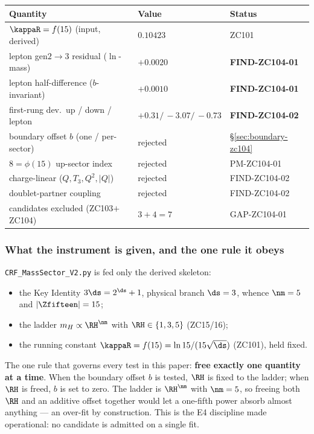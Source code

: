 \documentclass[12pt, a4paper]{article}
\begin{document}
\begin{keybox}[title={Numerical Summary --- ZC104 (T-canonical)}]
{\small\renewcommand{\arraystretch}{1.25}
\begin{center}
\begin{tabular}{@{}p{6.2cm}p{3.2cm}p{3.0cm}@{}}
\toprule
\textbf{Quantity} & \textbf{Value} & \textbf{Status} \\
\midrule
$\kappaR=f(15)$ (input, derived)          & $0.10423$        & ZC101 \\
lepton gen$2{\to}3$ residual ($\ln$-mass) & $+0.0020$        & \textbf{FIND-ZC104-01} \\
lepton half-difference ($b$-invariant)    & $+0.0010$        & \textbf{FIND-ZC104-01} \\
first-rung dev.\ up / down / lepton        & $+0.31/\,{-}3.07/\,{-}0.73$ & \textbf{FIND-ZC104-02} \\
boundary offset $b$ (one / per-sector)     & rejected          & \S\ref{sec:boundary-zc104} \\
$8=\phi(15)$ up-sector index               & rejected          & PM-ZC104-01 \\
charge-linear ($Q,T_3,Q^2,|Q|$)            & rejected          & FIND-ZC104-02 \\
doublet-partner coupling                    & rejected          & FIND-ZC104-02 \\
candidates excluded (ZC103$+$ZC104)        & $3+4=7$           & GAP-ZC104-01 \\
\bottomrule
\end{tabular}
\end{center}}
\end{keybox}

\subsubsection{What the instrument is given, and the one rule it obeys}

\texttt{CRF\_MassSector\_V2.py} is fed only the derived skeleton:
\begin{itemize}[leftmargin=2em, noitemsep]
  \item the Key Identity $3\ds=2^{\ds}+1$, physical branch $\ds=3$, whence
    $\nm=5$ and $|\Zfifteen|=15$;
  \item the ladder $m_H\propto\RH^{\nm}$ with $\RH\in\{1,3,5\}$ (ZC15/16);
  \item the running constant $\kappaR=f(15)=\ln 15/(15\sqrt{\ds})$ (ZC101),
    held fixed.
\end{itemize}
The one rule that governs every test in this paper: \textbf{free exactly one
quantity at a time}. When the boundary offset $b$ is tested, $\RH$ is fixed to the
ladder; when $\RH$ is freed, $b$ is set to zero. The ladder is $\RH^{\nm}$ with
$\nm=5$, so freeing both $\RH$ and an additive offset together would let a
one-fifth power absorb almost anything --- an over-fit by construction. This is
the E4 discipline made operational: no candidate is admitted on a single fit.
\end{document}
